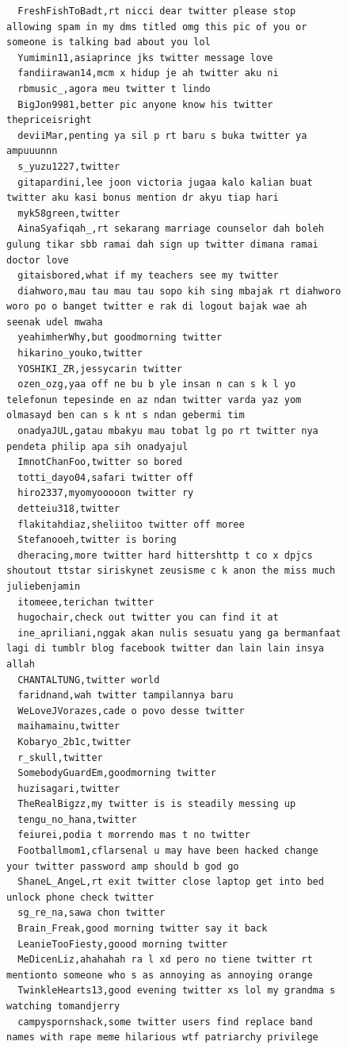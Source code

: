 \begin{figure}[htpb]
\begin{verbatim}
  FreshFishToBadt,rt nicci dear twitter please stop allowing spam in my dms titled omg this pic of you or someone is talking bad about you lol
  Yumimin11,asiaprince jks twitter message love
  fandiirawan14,mcm x hidup je ah twitter aku ni
  rbmusic_,agora meu twitter t lindo
  BigJon9981,better pic anyone know his twitter thepriceisright
  deviiMar,penting ya sil p rt baru s buka twitter ya ampuuunnn
  s_yuzu1227,twitter
  gitapardini,lee joon victoria jugaa kalo kalian buat twitter aku kasi bonus mention dr akyu tiap hari
  myk58green,twitter
  AinaSyafiqah_,rt sekarang marriage counselor dah boleh gulung tikar sbb ramai dah sign up twitter dimana ramai doctor love
  gitaisbored,what if my teachers see my twitter
  diahworo,mau tau mau tau sopo kih sing mbajak rt diahworo woro po o banget twitter e rak di logout bajak wae ah seenak udel mwaha
  yeahimherWhy,but goodmorning twitter
  hikarino_youko,twitter
  YOSHIKI_ZR,jessycarin twitter
  ozen_ozg,yaa off ne bu b yle insan n can s k l yo telefonun tepesinde en az ndan twitter varda yaz yom olmasayd ben can s k nt s ndan gebermi tim
  onadyaJUL,gatau mbakyu mau tobat lg po rt twitter nya pendeta philip apa sih onadyajul
  ImnotChanFoo,twitter so bored
  totti_dayo04,safari twitter off
  hiro2337,myomyooooon twitter ry
  detteiu318,twitter
  flakitahdiaz,sheliitoo twitter off moree
  Stefanooeh,twitter is boring
  dheracing,more twitter hard hittershttp t co x dpjcs shoutout ttstar siriskynet zeusisme c k anon the miss much juliebenjamin
  itomeee,terichan twitter
  hugochair,check out twitter you can find it at
  ine_apriliani,nggak akan nulis sesuatu yang ga bermanfaat lagi di tumblr blog facebook twitter dan lain lain insya allah
  CHANTALTUNG,twitter world
  faridnand,wah twitter tampilannya baru
  WeLoveJVorazes,cade o povo desse twitter
  maihamainu,twitter
  Kobaryo_2b1c,twitter
  r_skull,twitter
  SomebodyGuardEm,goodmorning twitter
  huzisagari,twitter
  TheRealBigzz,my twitter is is steadily messing up
  tengu_no_hana,twitter
  feiurei,podia t morrendo mas t no twitter
  Footballmom1,cflarsenal u may have been hacked change your twitter password amp should b god go
  ShaneL_AngeL,rt exit twitter close laptop get into bed unlock phone check twitter
  sg_re_na,sawa chon twitter
  Brain_Freak,good morning twitter say it back
  LeanieTooFiesty,goood morning twitter
  MeDicenLiz,ahahahah ra l xd pero no tiene twitter rt mentionto someone who s as annoying as annoying orange
  TwinkleHearts13,good evening twitter xs lol my grandma s watching tomandjerry
  campyspornshack,some twitter users find replace band names with rape meme hilarious wtf patriarchy privilege

\end{verbatim}
\end{figure}
